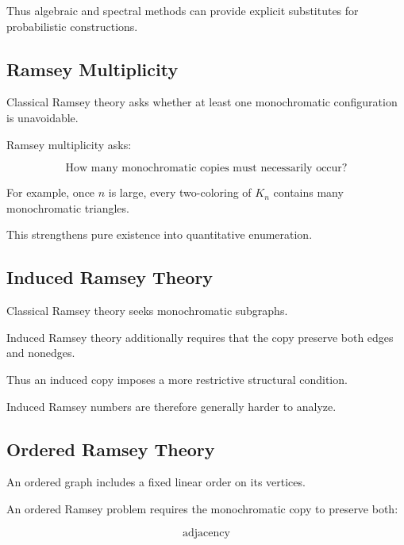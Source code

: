 Thus algebraic and spectral methods can provide explicit substitutes for
probabilistic constructions.

\subsection{Ramsey Multiplicity}
\label{subsec:ramsey-multiplicity}

Classical Ramsey theory asks whether at least one monochromatic
configuration is unavoidable.

Ramsey multiplicity asks:

\[
\boxed{
\text{How many monochromatic copies must necessarily occur?}
}
\]

For example, once \(n\) is large, every two-coloring of \(K_n\)
contains many monochromatic triangles.

This strengthens pure existence into quantitative enumeration.

\subsection{Induced Ramsey Theory}
\label{subsec:induced-ramsey}

Classical Ramsey theory seeks monochromatic subgraphs.

Induced Ramsey theory additionally requires that the copy preserve both
edges and nonedges.

Thus an induced copy imposes a more restrictive structural condition.

Induced Ramsey numbers are therefore generally harder to analyze.

\subsection{Ordered Ramsey Theory}
\label{subsec:ordered-ramsey}

An ordered graph includes a fixed linear order on its vertices.

An ordered Ramsey problem requires the monochromatic copy to preserve
both:

\[
\text{adjacency}
\]

